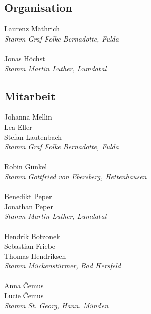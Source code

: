 \begin{centering}
\begin{multicols}{2}

\subsection*{Organisation}
Laurenz Mäthrich \\ \textit{Stamm Graf Folke Bernadotte, Fulda} \\ ~\\
Jonas Höchst \\ \textit{Stamm Martin Luther, Lumdatal} \\

\subsection*{Mitarbeit}
Johanna Mellin \\ Lea Eller \\ Stefan Lautenbach \\ \textit{Stamm Graf Folke Bernadotte, Fulda} \\ ~\\
Robin Günkel \\ \textit{Stamm Gottfried von Ebersberg, Hettenhausen} \\ ~\\
Benedikt Peper \\ Jonathan Peper \\ \textit{Stamm Martin Luther, Lumdatal} \\ ~\\
Hendrik Botzonek \\ Sebastian Friebe \\ Thomas Hendriksen \\ \textit{Stamm Mückenstürmer, Bad Hersfeld} \\ ~\\
Anna \v{C}emus \\ Lucie \v{C}emus \\ \textit{Stamm St. Georg, Hann. Münden} \\


\end{multicols}
\end{centering}
